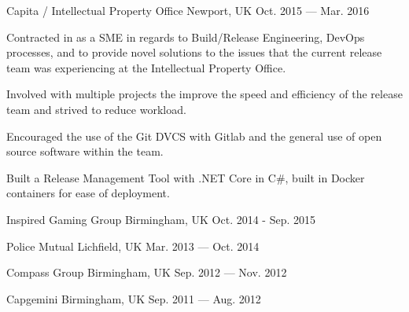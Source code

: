 \begin{cventries}
    {Capita / Intellectual Property Office} %
    {Newport, UK} %
    {Oct. 2015 — Mar. 2016} %
    {
        \begin{cvitems} %
        \item {Contracted in as a SME in regards to Build/Release Engineering, DevOps processes, and to provide novel solutions to the issues that the current release team was experiencing at the Intellectual Property Office.}
        \item {Involved with multiple projects the improve the speed and efficiency of the release team and strived to reduce workload.}
        \item {Encouraged the use of the Git DVCS with Gitlab and the general use of open source software within the team.}
        \item {Built a Release Management Tool with .NET Core in C\#, built in Docker containers for ease of deployment.}
        \end{cvitems}
    }


    {Inspired Gaming Group} %
    {Birmingham, UK} %
    {Oct. 2014 - Sep. 2015} %
    {}


    {Police Mutual} %
    {Lichfield, UK} %
    {Mar. 2013 — Oct. 2014} %
    {}

    {Compass Group} %
    {Birmingham, UK} %
    {Sep. 2012 — Nov. 2012} %
    {}

    {Capgemini} %
    {Birmingham, UK} %
    {Sep. 2011 — Aug. 2012} %
    {}

\end{cventries}
